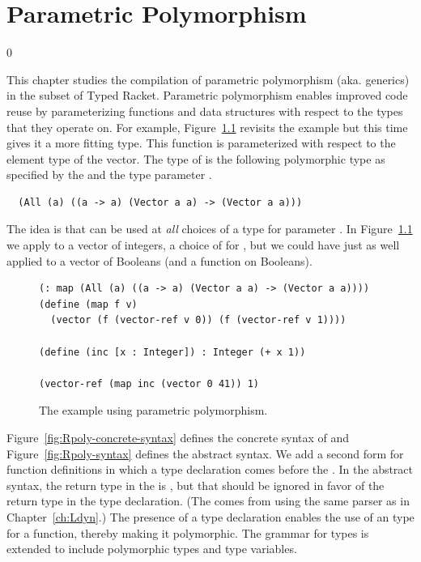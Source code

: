 \documentclass[7x10,nocrop]{TimesAPriori_MIT}%
\def\racketEd{0}
\def\edition{1}
\begin{document}
\chapter{Parametric Polymorphism}
\label{ch:Lpoly}

\if\edition\racketEd

This chapter studies the compilation of parametric
polymorphism
(aka. generics) in the subset \LangPoly{} of Typed
Racket. Parametric polymorphism enables improved code reuse by
parameterizing functions and data structures with respect to the types
that they operate on. For example, Figure~\ref{fig:map-poly}
revisits the  example but this time gives it a more
fitting type.  This  function is parameterized with
respect to the element type of the vector. The type of 
is the following polymorphic type as specified by the  and
the type parameter .
\begin{lstlisting}
  (All (a) ((a -> a) (Vector a a) -> (Vector a a)))
\end{lstlisting}
The idea is that  can be used at \emph{all} choices of a
type for parameter . In Figure~\ref{fig:map-poly} we apply
 to a vector of integers, a choice of  for
, but we could have just as well applied  to a
vector of Booleans (and a function on Booleans).

\begin{figure}[tbp]
\begin{lstlisting}
(: map (All (a) ((a -> a) (Vector a a) -> (Vector a a))))
(define (map f v)
  (vector (f (vector-ref v 0)) (f (vector-ref v 1))))

(define (inc [x : Integer]) : Integer (+ x 1))

(vector-ref (map inc (vector 0 41)) 1)
\end{lstlisting}
\caption{The  example using parametric polymorphism.}
\label{fig:map-poly}
\end{figure}

Figure~\ref{fig:Rpoly-concrete-syntax} defines the concrete syntax of
\LangPoly{} and Figure~\ref{fig:Rpoly-syntax} defines the abstract
syntax. We add a second form for function definitions in which a type
declaration comes before the . In the abstract syntax,
the return type in the  is , but that should be
ignored in favor of the return type in the type declaration.  (The
 comes from using the same parser as in
Chapter~\ref{ch:Ldyn}.)  The presence of a type declaration
enables the use of an  type for a function, thereby making
it polymorphic. The grammar for types is extended to include
polymorphic types and type variables.
\end{document}
